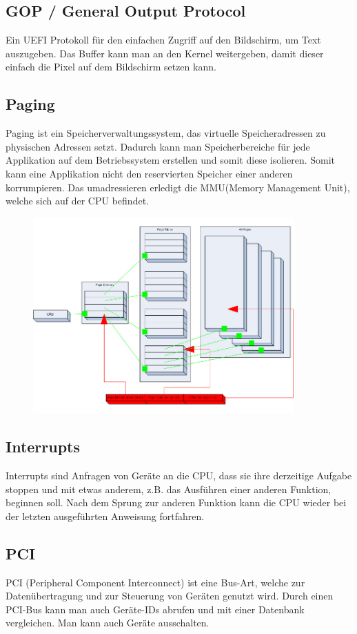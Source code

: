 \documentclass[12pt]{article}
\begin{document}
	\subsection{GOP / General Output Protocol}
	Ein UEFI Protokoll für den einfachen Zugriff auf den Bildschirm, um Text auszugeben. Das Buffer kann man an den Kernel weitergeben, damit dieser einfach die Pixel auf dem Bildschirm setzen kann. 
	\subsection{Paging}
	Paging ist ein Speicherverwaltungssystem, das virtuelle Speicheradressen zu physischen Adressen setzt. Dadurch kann man Speicherbereiche für jede Applikation auf dem Betriebssystem erstellen und somit diese isolieren. Somit kann eine Applikation nicht den reservierten Speicher einer anderen korrumpieren. Das umadressieren erledigt die MMU(Memory Management Unit), welche sich auf der CPU befindet.
	\begin{figure}[h]
		\centering
		\includegraphics[width=10cm]{paging}
	\end{figure}
	\newpage
	\subsection{Interrupts}
	Interrupts sind Anfragen von Geräte an die CPU, dass sie ihre derzeitige Aufgabe stoppen und mit etwas anderem, z.B. das Ausführen einer anderen Funktion, beginnen soll. Nach dem Sprung zur anderen Funktion kann die CPU wieder bei der letzten ausgeführten Anweisung fortfahren.
	\subsection{PCI}
	PCI (Peripheral Component Interconnect) ist eine Bus-Art, welche zur Datenübertragung und zur Steuerung von Geräten genutzt wird. Durch einen PCI-Bus kann man auch Geräte-IDs abrufen und mit einer Datenbank vergleichen. Man kann auch Geräte ausschalten.
	\subsection{}
\end{document}
